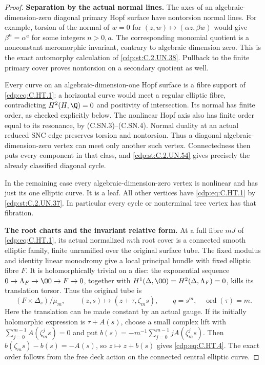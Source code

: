 \begin{proof}
\par\medskip\noindent\textbf{Separation by the actual normal lines.}
The axes of an algebraic-dimension-zero diagonal primary Hopf
surface have nontorsion normal lines. For example, torsion of the
normal of $w=0$ for $(z,w)\mapsto(\alpha z,\beta w)$ would give
$\beta^n=\alpha^a$ for some integers $n>0,a$. The corresponding
monomial quotient is a nonconstant meromorphic invariant, contrary
to algebraic dimension zero. This is the exact automorphy
calculation of \ref{cdp:st:C.2.UN.38}. Pullback to the finite primary cover
proves nontorsion on a secondary quotient as well.

Every curve on an algebraic-dimension-one Hopf surface is a fibre
support of \eqref{cdp:eq:C.HT.1}: a horizontal curve would meet a regular elliptic
fibre, contradicting $H^2(H,\Q)=0$ and positivity of intersection.
Its normal has finite order, as checked explicitly below. The
nonlinear Hopf axis also has finite order equal to its resonance,
by (C.SN.3)--(C.SN.4). Normal duality at an actual reduced SNC edge
preserves torsion and nontorsion. Thus a diagonal
algebraic-dimension-zero vertex can meet only another such vertex.
Connectedness then puts every component in that class, and
\ref{cdp:st:C.2.UN.54} gives precisely the already classified diagonal cycle.

In the remaining case every algebraic-dimension-zero vertex is
nonlinear and has just its one elliptic curve. It is a leaf.
All other vertices have \eqref{cdp:eq:C.HT.1} by \ref{cdp:st:C.2.UN.37}. In particular every
cycle or nonterminal tree vertex has that fibration.

\par\medskip\noindent\textbf{The root charts and the invariant relative form.}
At a full fibre $mJ$ of \eqref{cdp:eq:C.HT.1}, its actual normalized $m$th root
cover is a connected smooth elliptic family, finite unramified over
the original surface tube. The fixed modulus and identity linear
monodromy give a local principal bundle with fixed elliptic fibre
$F$. It is holomorphically trivial on a disc: the exponential
sequence $0\to\Lambda_F\to\OO\to F\to0$, together with
$H^1(\Delta,\OO)=H^2(\Delta,\Lambda_F)=0$, kills its translation
torsor. Thus the original tube is
\[
       (F\times\Delta_s)/\mu_m,\qquad
       (z,s)\longmapsto(z+\tau,\zeta_m s),\qquad
       q=s^m,\quad \operatorname{ord}(\tau)=m.          \tag{C.HT.4}\label{cdp:eq:C.HT.4}
\]
Here the translation can be made constant by an actual gauge.
If its initially holomorphic expression is $\tau+A(s)$, choose a
small complex lift with $\sum_{j=0}^{m-1}A(\zeta_m^j s)=0$ and put
$b(s)=-m^{-1}\sum_{j=0}^{m-1}jA(\zeta_m^j s)$.
Then $b(\zeta_ms)-b(s)=-A(s)$, so $z\mapsto z+b(s)$ gives \eqref{cdp:eq:C.HT.4}.
The exact order follows from the free deck action on the connected
central elliptic curve.


\end{proof}
